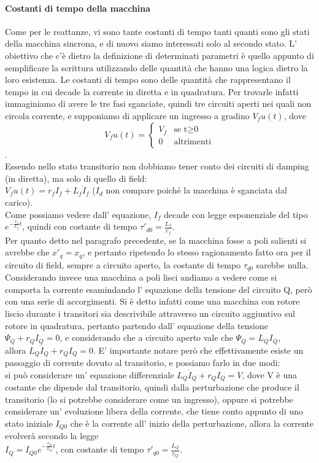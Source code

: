 \documentclass[Lau,noexaminfo]{sapthesis}
\begin{document}
	\paragraph{Costanti di tempo della macchina}
	Come per le reattanze, vi sono tante costanti di tempo tanti quanti sono gli stati della macchina sincrona, e di nuovo siamo interessati solo al secondo stato. L' obiettivo che c'è dietro la definizione di determinati parametri è quello appunto di semplificare la scrittura utilizzando delle quantità che hanno una logica dietro la loro esistenza. Le costanti di tempo sono delle quantità che rappresentano il tempo in cui decade la corrente in diretta e in quadratura. Per trovarle infatti immaginiamo di avere le tre fasi sganciate, quindi tre circuiti aperti nei quali non circola corrente, e supponiamo di applicare un ingresso a gradino $V_fu(t)$, dove\\
	\[
	V_fu(t)=
	\begin{cases}
	V_f	& \text{se t$\ge$0}\\
	0	& \text{altrimenti}
	\end{cases}
	\].\\ Essendo nello stato transitorio non dobbiamo tener conto dei circuiti di damping (in diretta), ma solo di quello di field:\\
	$V_fu(t)=r_fI_f+L_f\dot{I}_f$ ($I_d$ non compare poiché la macchina è sganciata dal carico).\\
	Come possiamo vedere dall' equazione, $I_f$ decade con legge esponenziale del tipo $e^{-\frac{r_f}{L_f}t}$, quindi con costante di tempo $\tau'_{d0}=\frac{L_f}{r_f}$.\\
	Per quanto detto nel paragrafo precedente, se la macchina fosse a poli salienti si avrebbe che $x'_q=x_q$, e pertanto ripetendo lo stesso ragionamento fatto ora per il circuito di field, sempre a circuito aperto, la costante di tempo $\tau_{q0}$ sarebbe nulla. Considerando invece una macchina a poli lisci andiamo a vedere come si comporta la corrente esamindando l' equazione della tensione del circuito Q, però con una serie di accorgimenti. Si è detto infatti come una macchina con rotore liscio durante i transitori sia descrivibile attraverso un circuito aggiuntivo sul rotore in quadratura, pertanto partendo dall' equazione della tensione\\
	$\dot{\Psi}_Q+r_QI_Q=0$, e considerando che a circuito aperto vale che $\Psi_Q=L_QI_Q$,\\
	allora $L_Q\dot{I}_Q+r_QI_Q=0$. E' importante notare però che effettivamente esiste un passaggio di corrente dovuto al transitorio, e possiamo farlo in due modi:\\
	si può considerare un' equazione differenziale  $L_Q\dot{I}_Q+r_QI_Q=V$, dove V è una costante che dipende dal transitorio, quindi dalla perturbazione che produce il transitorio (lo si potrebbe considerare come un ingresso), oppure si potrebbe considerare un' evoluzione libera della corrente, che tiene conto appunto di uno stato iniziale $I_{Q0}$ che è la corrente all' inizio della perturbazione, allora la corrente evolverà secondo la legge\\
	$I_Q=I_{Q0}e^{-\frac{r_Q}{L_Q}t}$, con costante di tempo $\tau'_{q0}=\frac{L_Q}{r_Q}$.
	
\end{document}
